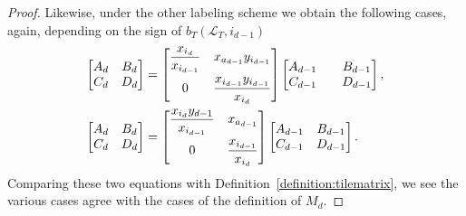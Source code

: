 \documentclass[pdftex]{sigma}
\numberwithin{equation}{section}
\theoremstyle{definition}
\begin{document}
\begin{proof}
Likewise, under the other labeling scheme we obtain the following cases, again, depending on the sign of $b_T(\mathcal{L}_T, i_{d-1})$
\begin{align*}
 \begin{bmatrix}
 A_d & B_d\\
 C_d & D_d
 \end{bmatrix}&=
\begin{bmatrix}
 \dfrac{x_{i_d}}{x_{i_{d-1}}} & x_{a_{d-1}}y_{i_{d-1}}\vspace{1mm}\\
 0 & \dfrac{x_{i_{d-1}}y_{i_{d-1}}}{x_{i_d}}
\end{bmatrix}
\begin{bmatrix}
 A_{d-1} && B_{d-1}\\
 C_{d-1} && D_{d-1}
 \end{bmatrix},
 \\
 \begin{bmatrix}
 A_d & B_d\\
 C_d & D_d
 \end{bmatrix}&=
\begin{bmatrix}
 \dfrac{x_{i_d}y_{d-1}}{x_{i_{d-1}}} & x_{a_{d-1}}\vspace{1mm}\\
 0 & \dfrac{x_{i_{d-1}}}{x_{i_d}}
\end{bmatrix}
\begin{bmatrix}
 A_{d-1} & B_{d-1}\\
 C_{d-1} & D_{d-1}
 \end{bmatrix}.
\end{align*}
Comparing these two equations with Definition~\ref{definition:tilematrix}, we see the various cases agree with the cases of the definition of $M_d$.
\end{proof}
\end{document}

